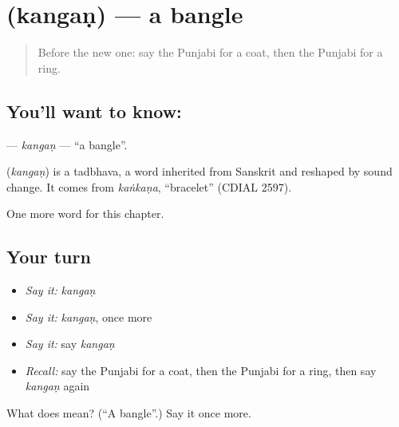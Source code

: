 \section[\texorpdfstring{\pa{ਕੰਗਣ} (kangaṇ)}{ਕੰਗਣ (kangaṇ)}]{ (kangaṇ) — a bangle}

\label{lesson:PA-C120-kangan}



\begin{quote}
Before the new one: say the Punjabi for a coat, then the Punjabi for a ring.
\end{quote}

\subsection*{You'll want to know: }
\textbf{} — \emph{kangaṇ} — \textquotedblleft{}a bangle\textquotedblright{}.

\begin{cousinweb}
\textbf{} (\emph{kangaṇ}) is a tadbhava, a word inherited from Sanskrit and reshaped by sound change. It comes from \emph{kaṅkaṇa}, \textquotedblleft{}bracelet\textquotedblright{} (CDIAL 2597).
\end{cousinweb}

\begin{grammarlens}[title={What you've built}]
One more word for this chapter.
\end{grammarlens}

\subsection*{Your turn}
\begin{itemize}
\raggedright
  \item \emph{Say it:} \emph{kangaṇ}
  \item \emph{Say it:} \emph{kangaṇ}, once more
  \item \emph{Say it:} say \emph{kangaṇ}
  \item \emph{Recall:} say the Punjabi for a coat, then the Punjabi for a ring, then say \emph{kangaṇ} again
\end{itemize}

\begin{tcolorbox}[breakable,colback=teal!4,colframe=teal!35!black,title={Before you move on}]
What does  mean? (\textquotedblleft{}A bangle\textquotedblright{}.) Say it once more.
\end{tcolorbox}
